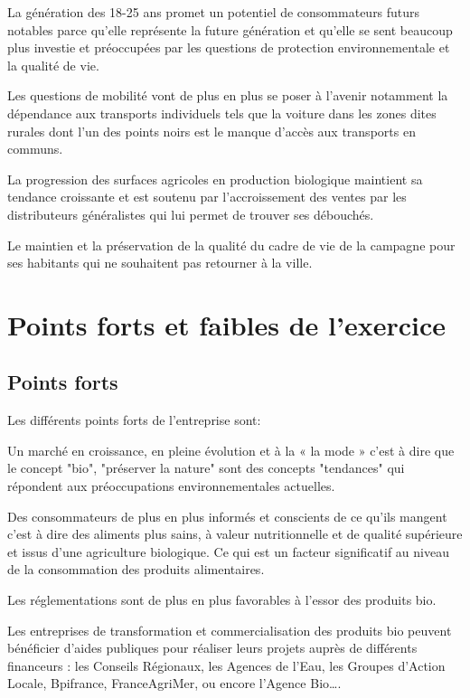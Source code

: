 \documentclass[12pt,a4paper]{report}
\begin{document}
La génération des 18-25 ans promet un potentiel de consommateurs futurs notables parce qu'elle représente la future génération et qu'elle se sent beaucoup plus investie et préoccupées par les questions de protection environnementale et la qualité de vie. 

Les questions de mobilité vont de plus en plus se poser à l'avenir notamment la dépendance aux transports individuels tels que la voiture dans les zones dites rurales dont l'un des points noirs est le manque d'accès aux transports en communs.

La progression des surfaces agricoles en production biologique maintient sa tendance croissante et est soutenu par l'accroissement des ventes par les distributeurs généralistes qui lui permet de trouver ses débouchés.

Le maintien et la préservation de la qualité du cadre de vie de la campagne pour ses habitants qui ne souhaitent pas retourner à la ville. 

		\section{Points forts et faibles de l'exercice}

\subsection{Points forts}
Les différents points forts de l'entreprise sont:

Un marché en croissance, en pleine évolution et à la « la mode » c'est à dire que le concept "bio",  "préserver la nature" sont des concepts "tendances" qui répondent aux préoccupations environnementales actuelles. 

Des consommateurs de plus en plus informés et conscients de ce qu’ils mangent c'est à dire des aliments plus sains, à valeur nutritionnelle et de qualité supérieure et issus d'une agriculture biologique. Ce qui est un facteur significatif au niveau de la consommation des produits alimentaires. 

Les réglementations sont de plus en plus favorables à l’essor des produits bio.

Les entreprises de transformation et commercialisation des produits bio peuvent bénéficier d’aides publiques pour réaliser leurs projets auprès de différents financeurs : les Conseils Régionaux, les Agences de l’Eau, les Groupes d’Action Locale, Bpifrance, FranceAgriMer, ou encore l’Agence Bio….
\end{document}
